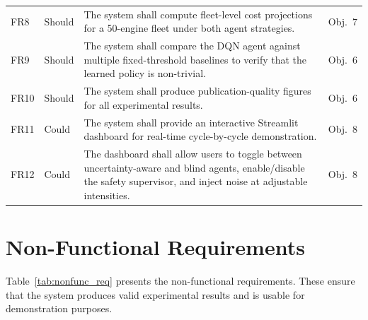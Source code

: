 \documentclass[12pt,a4paper]{report}
\begin{document}
\begin{table}[h]
\begin{tabularx}{\textwidth}{@{}>{\raggedright\arraybackslash}p{1.0cm} >{\raggedright\arraybackslash}p{1.55cm} >{\raggedright\arraybackslash}X >{\raggedright\arraybackslash}p{1.55cm}@{}}
\addlinespace
FR8 & Should & The system shall compute fleet-level cost projections for a 50-engine fleet under both agent strategies. & Obj.~7 \\
FR9 & Should & The system shall compare the DQN agent against multiple fixed-threshold baselines to verify that the learned policy is non-trivial. & Obj.~6 \\
FR10 & Should & The system shall produce publication-quality figures for all experimental results. & Obj.~6 \\
\addlinespace
FR11 & Could & The system shall provide an interactive Streamlit dashboard for real-time cycle-by-cycle demonstration. & Obj.~8 \\
FR12 & Could & The dashboard shall allow users to toggle between uncertainty-aware and blind agents, enable/disable the safety supervisor, and inject noise at adjustable intensities. & Obj.~8 \\
\bottomrule
\end{tabularx}
\end{table}

\section{Non-Functional Requirements}

Table~\ref{tab:nonfunc_req} presents the non-functional requirements. These ensure that the system produces valid experimental results and is usable for demonstration purposes.
\end{document}
